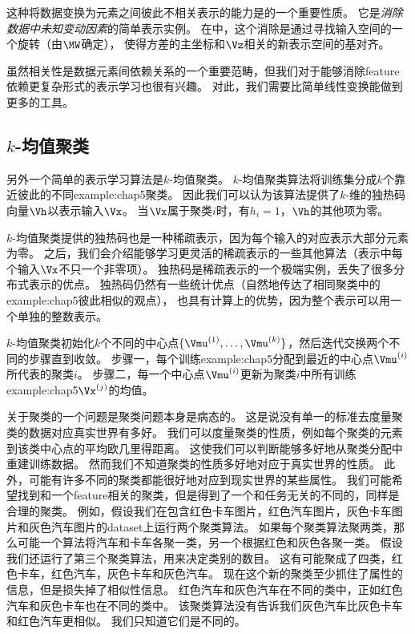 这种将数据变换为元素之间彼此不相关表示的能力是的一个重要性质。
它是\emph{消除数据中未知变动因素}的简单表示实例。
在中，这个消除是通过寻找输入空间的一个旋转（由$\MW$确定），
使得方差的主坐标和$\Vz$相关的新表示空间的基对齐。


虽然相关性是数据元素间依赖关系的一个重要范畴，但我们对于能够消除\gls{feature}依赖更复杂形式的表示学习也很有兴趣。
对此，我们需要比简单线性变换能做到更多的工具。

\subsection{$k$-均值聚类}
\label{sec:k_means_clustering}
另外一个简单的表示学习算法是$k$-均值聚类。
$k$-均值聚类算法将训练集分成$k$个靠近彼此的不同\gls{example:chap5}聚类。
因此我们可以认为该算法提供了$k$-维的独热码向量$\Vh$以表示输入$\Vx$。
当$\Vx$属于聚类$i$时，有$h_i=1$，$\Vh$的其他项为零。

$k$-均值聚类提供的独热码也是一种稀疏表示，因为每个输入的对应表示大部分元素为零。
之后，我们会介绍能够学习更灵活的稀疏表示的一些其他算法（表示中每个输入$\Vx$不只一个非零项）。
独热码是稀疏表示的一个极端实例，丢失了很多分布式表示的优点。
独热码仍然有一些统计优点（自然地传达了相同聚类中的\gls{example:chap5}彼此相似的观点），
也具有计算上的优势，因为整个表示可以用一个单独的整数表示。

$k$-均值聚类初始化$k$个不同的中心点$\{\Vmu^{(1)},\dots,\Vmu^{(k)}\}$，然后迭代交换两个不同的步骤直到收敛。
步骤一，每个训练\gls{example:chap5}分配到最近的中心点$\Vmu^{(i)}$所代表的聚类$i$。
步骤二，每一个中心点$\Vmu^{(i)}$更新为聚类$i$中所有训练\gls{example:chap5}$\Vx^{(j)}$的均值。

关于聚类的一个问题是聚类问题本身是病态的。
这是说没有单一的标准去度量聚类的数据对应真实世界有多好。
我们可以度量聚类的性质，例如每个聚类的元素到该类中心点的平均欧几里得距离。
这使我们可以判断能够多好地从聚类分配中重建训练数据。
然而我们不知道聚类的性质多好地对应于真实世界的性质。
此外，可能有许多不同的聚类都能很好地对应到现实世界的某些属性。
我们可能希望找到和一个\gls{feature}相关的聚类，但是得到了一个和任务无关的不同的，同样是合理的聚类。
例如，假设我们在包含红色卡车图片，红色汽车图片，灰色卡车图片和灰色汽车图片的\gls{dataset}上运行两个聚类算法。
如果每个聚类算法聚两类，那么可能一个算法将汽车和卡车各聚一类，另一个根据红色和灰色各聚一类。
假设我们还运行了第三个聚类算法，用来决定类别的数目。
这有可能聚成了四类，红色卡车，红色汽车，灰色卡车和灰色汽车。
现在这个新的聚类至少抓住了属性的信息，但是损失掉了相似性信息。
红色汽车和灰色汽车在不同的类中，正如红色汽车和灰色卡车也在不同的类中。
该聚类算法没有告诉我们灰色汽车比灰色卡车和红色汽车更相似。
我们只知道它们是不同的。

